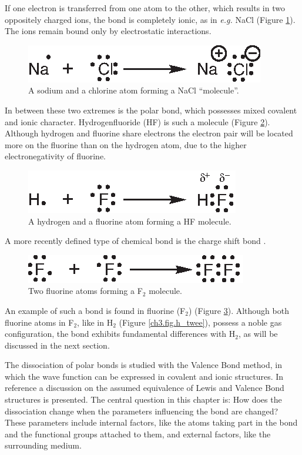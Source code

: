 If one electron is transferred from one atom to the other, which results in two oppositely charged ions, the bond is completely ionic, as in \textit{e.g.} NaCl (Figure \ref{ch3.fig.nacl}). The ions remain bound only by electrostatic interactions. 
\begin{figure}[ht]
\center
\includegraphics{dissociation/figures/nacl.eps}
\caption{A sodium and a chlorine atom forming a NaCl ``molecule''.}
\label{ch3.fig.nacl}
\end{figure}

In between these two extremes is the polar bond, which possesses mixed covalent and ionic character. Hydrogenfluoride (HF) is such a molecule (Figure \ref{ch3.fig.hf}). Although hydrogen and fluorine share electrons the electron pair will be located more on the fluorine than on the hydrogen atom, due to the higher electronegativity of fluorine.
\begin{figure}[ht]
\center
\includegraphics{dissociation/figures/hf.eps}
\caption{A hydrogen and a fluorine atom forming a HF molecule.}
\label{ch3.fig.hf}
\end{figure}

A more recently defined type of chemical bond is the charge shift bond \cite{cs1,cs2}.
\begin{figure}[h]
\center
\includegraphics{dissociation/figures/f_twee.eps}
\caption{Two fluorine atoms forming a F$_2$ molecule.}
\label{ch3.fig.f_twee} 
\end{figure}
 An example of such a bond is found in fluorine (F$_2$)  (Figure \ref{ch3.fig.f_twee}). Although both fluorine atoms in F$_2$, like in H$_2$ (Figure \ref{ch3.fig.h_twee}), possess a noble gas configuration, the bond exhibits fundamental differences with H$_2$, as will be discussed in the next section.

The dissociation of polar bonds is studied with the Valence Bond method, in which the wave function can be expressed in covalent and ionic structures. In reference \cite{interpret} a discussion on the assumed equivalence of Lewis and Valence Bond structures is presented. The central question in this chapter is: How does the dissociation change when the parameters influencing the bond are changed? These parameters include internal factors, like the atoms taking part in the bond and the functional groups attached to them, and external factors, like the surrounding medium. 

